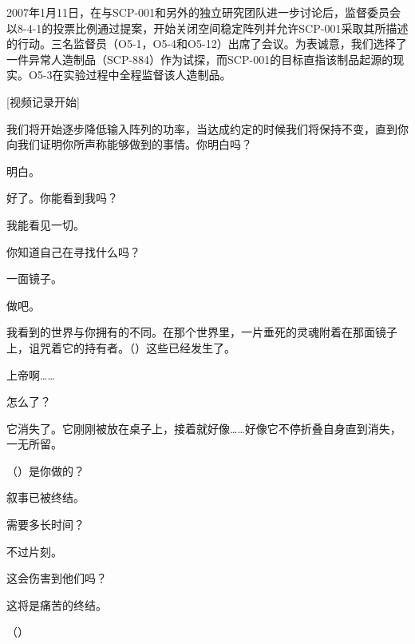 2007年1月11日，在与SCP-001和另外的独立研究团队进一步讨论后，监督委员会以8-4-1的投票比例通过提案，开始关闭空间稳定阵列并允许SCP-001采取其所描述的行动。三名监督员（O5-1，O5-4和O5-12）出席了会议。为表诚意，我们选择了一件异常人造制品（SCP-884）作为试探，而SCP-001的目标直指该制品起源的现实。O5-3在实验过程中全程监督该人造制品。

\begin{greenrecordbox}

{[}视频记录开始]


我们将开始逐步降低输入阵列的功率，当达成约定的时候我们将保持不变，直到你向我们证明你所声称能够做到的事情。你明白吗？

明白。


好了。你能看到我吗？

我能看见一切。

你知道自己在寻找什么吗？

一面镜子。

做吧。


我看到的世界与你拥有的不同。在那个世界里，一片垂死的灵魂附着在那面镜子上，诅咒着它的持有者。（）这些已经发生了。


上帝啊……

怎么了？

它消失了。它刚刚被放在桌子上，接着就好像……好像它不停折叠自身直到消失，一无所留。

（）是你做的？

叙事已被终结。

需要多长时间？

不过片刻。

这会伤害到他们吗？

这将是痛苦的终结。

（）


\end{greenrecordbox}
